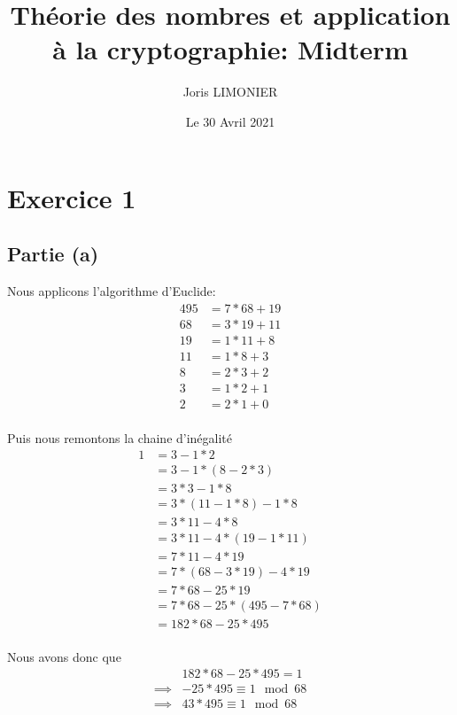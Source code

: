 \documentclass[12pt]{article}
\title{Théorie des nombres et application à la cryptographie: Midterm}
\author{Joris LIMONIER}
\date{Le 30 Avril 2021}
\begin{document}
\maketitle


\section{Exercice 1}
\subsection{Partie (a)}

Nous applicons l'algorithme d'Euclide:
\begin{align*}
    495 & = 7 * 68 + 19  \\
    68  & = 3 * 19  + 11 \\
    19  & = 1 * 11  + 8  \\
    11  & = 1 * 8  + 3   \\
    8   & = 2 * 3  + 2   \\
    3   & = 1 * 2  + 1   \\
    2   & = 2 * 1  + 0   \\
\end{align*}

Puis nous remontons la chaine d'inégalité
\begin{align*}
    1 & = 3    - 1 * 2                 \\
      & = 3    - 1 * (8 - 2*3)         \\
      & = 3 * 3    - 1 * 8             \\
      & = 3 * (11 - 1*8)    - 1 * 8    \\
      & = 3 * 11 - 4 * 8               \\
      & = 3 * 11 - 4 * (19 - 1*11)     \\
      & = 7 * 11 - 4 * 19              \\
      & = 7 * (68 - 3 * 19) - 4 * 19   \\
      & = 7 * 68 - 25 * 19             \\
      & = 7 * 68 - 25 * (495 - 7 * 68) \\
      & = 182 * 68 - 25 * 495          \\
\end{align*}

Nous avons donc que
\begin{align*}
             & 182 * 68 - 25 * 495 = 1     \\
    \implies & - 25 * 495 \equiv 1 \mod 68 \\
    \implies & 43 * 495 \equiv 1 \mod 68   \\
\end{align*}
\end{document}
